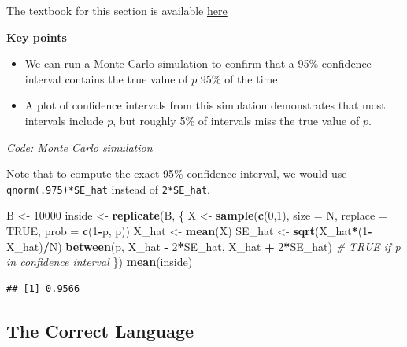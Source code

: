 \documentclass[
]{article}
\newenvironment{Shaded}{\begin{snugshade}}{\end{snugshade}}
\newcommand{\CommentTok}[1]{\textcolor[rgb]{0.56,0.35,0.01}{\textit{#1}}}
\newcommand{\DataTypeTok}[1]{\textcolor[rgb]{0.13,0.29,0.53}{#1}}
\newcommand{\DecValTok}[1]{\textcolor[rgb]{0.00,0.00,0.81}{#1}}
\newcommand{\KeywordTok}[1]{\textcolor[rgb]{0.13,0.29,0.53}{\textbf{#1}}}
\newcommand{\NormalTok}[1]{#1}
\newcommand{\OperatorTok}[1]{\textcolor[rgb]{0.81,0.36,0.00}{\textbf{#1}}}
\newcommand{\OtherTok}[1]{\textcolor[rgb]{0.56,0.35,0.01}{#1}}
\newcommand{\StringTok}[1]{\textcolor[rgb]{0.31,0.60,0.02}{#1}}
\providecommand{\tightlist}{%
  \setlength{\itemsep}{0pt}\setlength{\parskip}{0pt}}
\begin{document}
The textbook for this section is available
\href{https://rafalab.github.io/dsbook/inference.html\#a-monte-carlo-simulation-1}{here}

\textbf{Key points}

\begin{itemize}
\tightlist
\item
  We can run a Monte Carlo simulation to confirm that a 95\% confidence
  interval contains the true value of \(p\) 95\% of the time.
\item
  A plot of confidence intervals from this simulation demonstrates that
  most intervals include \(p\), but roughly 5\% of intervals miss the
  true value of \(p\).
\end{itemize}

\emph{Code: Monte Carlo simulation}

Note that to compute the exact 95\% confidence interval, we would use
\texttt{qnorm(.975)*SE\_hat} instead of \texttt{2*SE\_hat}.

\begin{Shaded}
\begin{Highlighting}[]
\NormalTok{B \textless{}{-}}\StringTok{ }\DecValTok{10000}
\NormalTok{inside \textless{}{-}}\StringTok{ }\KeywordTok{replicate}\NormalTok{(B, \{}
\NormalTok{    X \textless{}{-}}\StringTok{ }\KeywordTok{sample}\NormalTok{(}\KeywordTok{c}\NormalTok{(}\DecValTok{0}\NormalTok{,}\DecValTok{1}\NormalTok{), }\DataTypeTok{size =}\NormalTok{ N, }\DataTypeTok{replace =} \OtherTok{TRUE}\NormalTok{, }\DataTypeTok{prob =} \KeywordTok{c}\NormalTok{(}\DecValTok{1}\OperatorTok{{-}}\NormalTok{p, p))}
\NormalTok{    X\_hat \textless{}{-}}\StringTok{ }\KeywordTok{mean}\NormalTok{(X)}
\NormalTok{    SE\_hat \textless{}{-}}\StringTok{ }\KeywordTok{sqrt}\NormalTok{(X\_hat}\OperatorTok{*}\NormalTok{(}\DecValTok{1}\OperatorTok{{-}}\NormalTok{X\_hat)}\OperatorTok{/}\NormalTok{N)}
    \KeywordTok{between}\NormalTok{(p, X\_hat }\OperatorTok{{-}}\StringTok{ }\DecValTok{2}\OperatorTok{*}\NormalTok{SE\_hat, X\_hat }\OperatorTok{+}\StringTok{ }\DecValTok{2}\OperatorTok{*}\NormalTok{SE\_hat)    }\CommentTok{\# TRUE if p in confidence interval}
\NormalTok{\})}
\KeywordTok{mean}\NormalTok{(inside)}
\end{Highlighting}
\end{Shaded}

\begin{verbatim}
## [1] 0.9566
\end{verbatim}

\hypertarget{the-correct-language}{%
\subsection{The Correct Language}\label{the-correct-language}}
\end{document}
